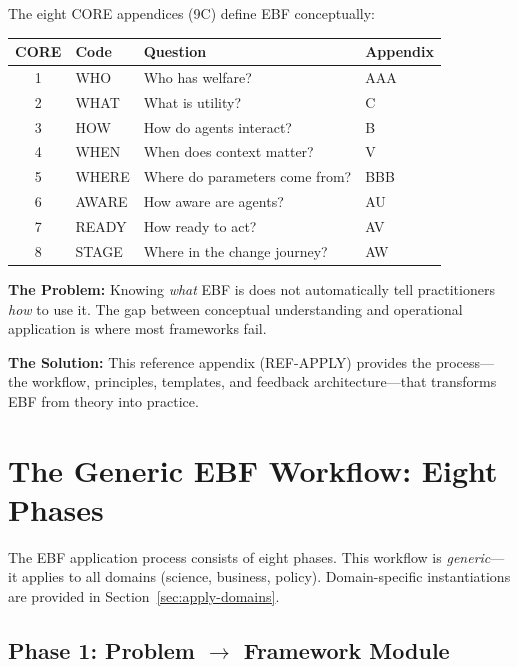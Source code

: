 The eight CORE appendices (9C) define EBF conceptually:

\begin{center}
\begin{tabular}{@{}clll@{}}
\toprule
\textbf{CORE} & \textbf{Code} & \textbf{Question} & \textbf{Appendix} \\
\midrule
1 & WHO & Who has welfare? & AAA \\
2 & WHAT & What is utility? & C \\
3 & HOW & How do agents interact? & B \\
4 & WHEN & When does context matter? & V \\
5 & WHERE & Where do parameters come from? & BBB \\
6 & AWARE & How aware are agents? & AU \\
7 & READY & How ready to act? & AV \\
8 & STAGE & Where in the change journey? & AW \\
\bottomrule
\end{tabular}
\end{center}

\textbf{The Problem:} Knowing \textit{what} EBF is does not automatically tell
practitioners \textit{how} to use it. The gap between conceptual understanding
and operational application is where most frameworks fail.

\textbf{The Solution:} This reference appendix (REF-APPLY) provides the process---the
workflow, principles, templates, and feedback architecture---that transforms EBF
from theory into practice.



\section{The Generic EBF Workflow: Eight Phases}
\label{sec:apply-workflow}

The EBF application process consists of eight phases. This workflow is
\textit{generic}---it applies to all domains (science, business, policy).
Domain-specific instantiations are provided in Section~\ref{sec:apply-domains}.

\subsection{Phase 1: Problem $\to$ Framework Module}

